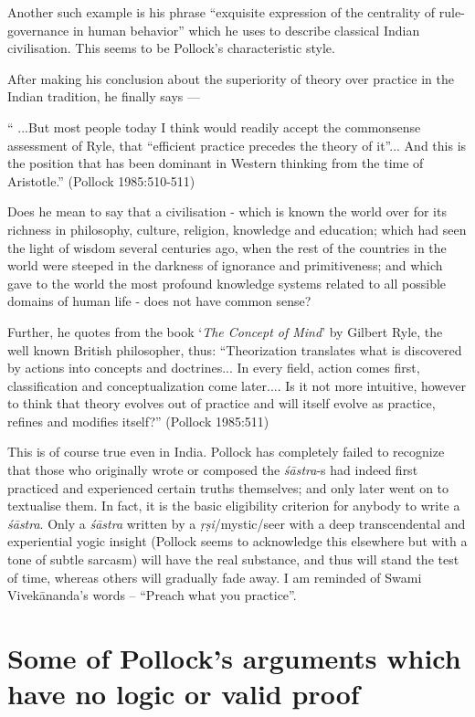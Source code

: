 Another such example is his phrase ``exquisite expression of the centrality of rule-governance in human behavior'' which he uses to describe classical Indian civilisation. This seems to be Pollock's characteristic style.

After making his conclusion about the superiority of theory over practice in the Indian tradition, he finally says ---
\begin{myquote}
`` ...But most people today I think would readily accept the commonsense assessment of Ryle, that ``efficient practice precedes the theory of it''... And this is the position that has been dominant in Western thinking from the time of Aristotle.'' (Pollock 1985:510-511)
\end{myquote}

Does he mean to say that a civilisation - which is known the world over for its richness in philosophy, culture, religion, knowledge and education; which had seen the light of wisdom several centuries ago, when the rest of the countries in the world were steeped in the darkness of ignorance and primitiveness; and which gave to the world the most profound knowledge systems related to all possible domains of human life - does not have common sense?

Further, he quotes from the book `\textit{The Concept of Mind}' by Gilbert Ryle, the well known British philosopher, thus: ``Theorization translates what is discovered by actions into concepts and doctrines... In every field, action comes first, classification and conceptualization come later.... Is it not more intuitive, however to think that theory evolves out of practice and will itself evolve as practice, refines and modifies itself?'' (Pollock 1985:511)

This is of course true even in India. Pollock has completely failed to recognize that those who originally wrote or composed the {\it śāstra}-s had indeed first practiced and experienced certain truths themselves; and only later went on to textualise them. In fact, it is the basic eligibility criterion for anybody to write a {\it śāstra}. Only a {\it śāstra} written by a {\it ṛṣi}/mystic/seer with a deep transcendental and experiential yogic insight (Pollock seems to acknowledge this elsewhere but with a tone of subtle sarcasm) will have the real substance, and thus will stand the test of time, whereas others will gradually fade away. I am reminded of Swami Vivekānanda's words -- ``Preach what you practice''.

\section*{Some of Pollock's arguments which have no logic or valid proof}


